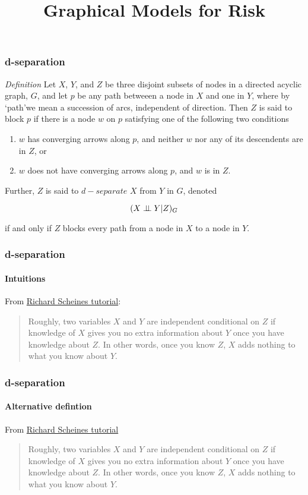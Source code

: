 


\title{Graphical Models for Risk}

\maketitle

\begin{frame}
\frametitle{d-separation}
\emph{Definition} Let $X$, $Y$, and $Z$ be three disjoint subsets of nodes in a directed acyclic graph, $G$, and let $p$ be any path betweeen a node in $X$ and one in $Y$, where by `path'we mean a succession of arcs, independent of direction. Then $Z$ is said to block $p$ if there is a node $w$ on $p$ satisfying one of the following two conditions

\begin{enumerate}
\item $w$ has converging arrows along $p$, and neither $w$ nor any of its descendents are in $Z$, or
\item $w$ does not have converging arrows along $p$, and $w$ is in $Z$.
\end{enumerate}

Further, $Z$ is said to $d-separate$ $X$ from $Y$ in $G$, denoted 

\begin{equation*}
    (X \perp\!\!\!\perp Y | Z)_G
\end{equation*}

if and only if $Z$ blocks every path from a node in $X$ to a node in $Y$.
\end{frame}


\begin{frame}
\frametitle{d-separation}
\framesubtitle{Intuitions}
From \href{https://www.andrew.cmu.edu/user/scheines/tutor/d-sep.html}{Richard Scheines tutorial}:\newline

\begin{quote}
Roughly, two variables $X$ and $Y$ are independent conditional on $Z$ if knowledge of $X$ gives you no extra information about $Y$ once you have knowledge about $Z$. In other words, once you know $Z$, $X$ adds nothing to what you know about $Y$.
\end{quote}
\end{frame}

\begin{frame}
    \frametitle{d-separation}
    \framesubtitle{Alternative defintion}
    From \href{https://www.andrew.cmu.edu/user/scheines/tutor/d-sep.html}{Richard Scheines tutorial}
    
    \begin{quote}
    Roughly, two variables $X$ and $Y$ are independent conditional on $Z$ if knowledge of $X$ gives you no extra information about $Y$ once you have knowledge about $Z$. In other words, once you know $Z$, $X$ adds nothing to what you know about $Y$.
    \end{quote}
\end{frame}


